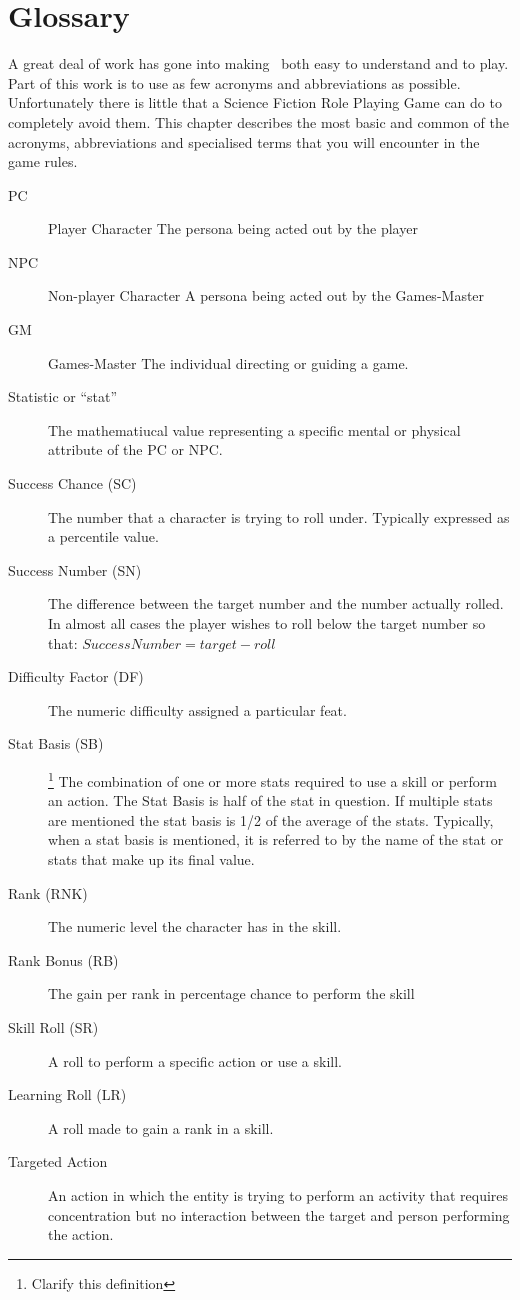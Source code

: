 \chapter{Glossary}

A great deal of work has gone into making \SH\ both
easy to understand and to play. Part of this work is to use as few 
acronyms and abbreviations as possible. Unfortunately there is little
that a Science Fiction Role Playing Game can do to completely avoid 
them. This chapter describes the most basic 
and common of the acronyms, abbreviations and specialised 
terms that you will encounter in the game rules. 

\begin{description}
	\item[PC] Player Character 
    The persona being acted out by the player
    \item[NPC] Non-player Character
    A persona being acted out by the Games-Master
    \item[GM] Games-Master
    The individual directing or guiding a game.
    \item[Statistic or ``stat'']
    The mathematiucal value representing a specific mental or 
	physical attribute of the PC or NPC.
	\item[Success Chance (SC)] 
	The number that a character is trying to roll under. 
	Typically expressed as a percentile value.
	\item[Success Number (SN)] 
	The difference between the target number and the number actually rolled. In
	almost all cases the player wishes to roll below the target number so that:
	\(Success Number = target - roll\)
	\item[Difficulty Factor (DF)] 
	The numeric difficulty assigned a particular feat.
	\item[Stat Basis (SB)] \footnote{Clarify this definition}
	The combination of one or more stats required to use a skill or perform an
    action. The Stat Basis is half of the stat in question. If 
	multiple stats are mentioned the stat basis is 1/2 of the average 
	of the stats. Typically, when a stat basis is mentioned, it is referred 
	to by the name of the stat or stats that make up its final value.
	\item[Rank (RNK)] 
	The numeric level the character has in the skill.
	\item[Rank Bonus (RB)]
	The gain per rank in percentage chance to perform the skill
	\item[Skill Roll (SR)]
	A roll to perform a specific action or use a skill.
	\item[Learning Roll (LR)]
	A roll made to gain a rank in a skill.
	\item[Targeted Action] 
	An action in which the entity is trying to perform an activity 
	that requires concentration but no interaction between the target 
	and person performing the action.
\end{description}

